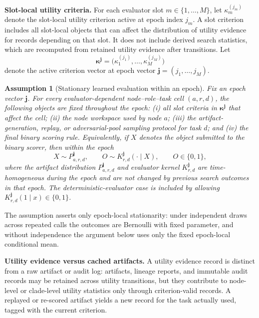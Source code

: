 \documentclass{paper}
\newtheorem{assumption}{Assumption}
\begin{document}
\noindent\textbf{Slot-local utility criteria.}
For each evaluator slot \(m\in\{1,\ldots,M\}\), let
\(\kappa_m^{(j_m)}\) denote the slot-local utility criterion active at epoch index \(j_m\).
A slot criterion includes all slot-local objects that can affect the distribution of utility evidence
for records depending on that slot. It does
not include derived search statistics, which are recomputed from retained utility evidence after
transitions. Let
\[
\boldsymbol{\kappa}^{\boldsymbol{j}}
=
\bigl(\kappa_1^{(j_1)},\ldots,\kappa_M^{(j_M)}\bigr)
\]
denote the active criterion vector at epoch vector \(\boldsymbol{j}=(j_1,\ldots,j_M)\).

\begin{assumption}[Stationary learned evaluation within an epoch]
\label{assumption:generative}
Fix an epoch vector \(\boldsymbol{j}\). For every evaluator-dependent node--role--task cell
\((a,r,d)\), the following objects are fixed throughout the epoch:
(i) all slot criteria in \(\boldsymbol{\kappa}^{\boldsymbol{j}}\) that affect the cell;
(ii) the node workspace used by node \(a\);
(iii) the artifact-generation, replay, or adversarial-pool sampling protocol for task \(d\); and
(iv) the final binary scoring rule.
Equivalently, if \(X\) denotes the object submitted to the binary scorer, then within the epoch
\[
X\sim P_{a,r,d}^{\boldsymbol{j}},
\qquad
O\sim K_{r,d}^{\boldsymbol{j}}(\cdot\mid X),
\qquad
O\in\{0,1\},
\]
where the artifact distribution \(P_{a,r,d}^{\boldsymbol{j}}\) and evaluator kernel
\(K_{r,d}^{\boldsymbol{j}}\) are time-homogeneous during the epoch and are not changed by previous
search outcomes in that epoch. The deterministic-evaluator case is included by allowing
\(K_{r,d}^{\boldsymbol{j}}(1\mid x)\in\{0,1\}\).
\end{assumption}

The assumption asserts only epoch-local stationarity: under independent draws across repeated calls
the outcomes are Bernoulli with fixed parameter, and without independence the argument below uses
only the fixed epoch-local conditional mean.

\noindent\textbf{Utility evidence versus cached artifacts.}
A utility evidence record is distinct from a raw artifact or audit log: artifacts, lineage reports,
and immutable audit records may be retained across utility transitions, but they contribute to
node-level or clade-level utility statistics only through criterion-valid records. A replayed or
re-scored artifact yields a new record for the task actually used, tagged with the current
criterion.
\end{document}
